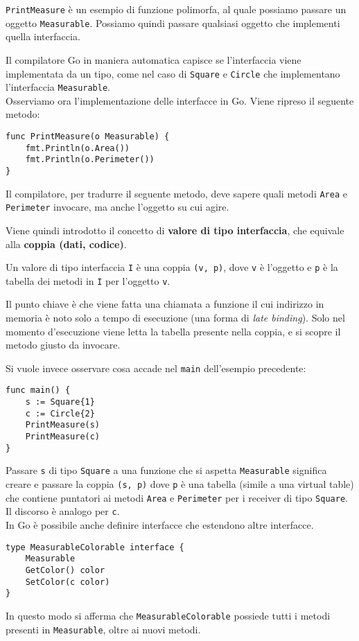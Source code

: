 \documentclass{article}
\begin{document}
\texttt{PrintMeasure} è un esempio di funzione polimorfa, al quale possiamo passare un oggetto \texttt{Measurable}. Possiamo quindi passare qualsiasi oggetto che implementi quella interfaccia.

Il compilatore Go in maniera automatica capisce se l'interfaccia viene implementata da un tipo, come nel caso di \texttt{Square} e \texttt{Circle} che implementano l'interfaccia \texttt{Measurable}.\vspace{14pt}\\
Osserviamo ora l'implementazione delle interfacce in Go. Viene ripreso il seguente metodo:
\begin{tcolorbox}
\begin{verbatim}
func PrintMeasure(o Measurable) {
    fmt.Println(o.Area())
    fmt.Println(o.Perimeter())
}
\end{verbatim}
\end{tcolorbox}
Il compilatore, per tradurre il seguente metodo, deve sapere quali metodi \texttt{Area} e \texttt{Perimeter} invocare, ma anche l'oggetto su cui agire.

Viene quindi introdotto il concetto di \textbf{valore di tipo interfaccia}, che equivale alla \textbf{coppia (dati, codice)}.

Un valore di tipo interfaccia \texttt{I} è una coppia \texttt{(v, p)}, dove \texttt{v} è l'oggetto e \texttt{p} è la tabella dei metodi in \texttt{I} per l'oggetto \texttt{v}.

Il punto chiave è che viene fatta una chiamata a funzione il cui indirizzo in memoria è noto solo a tempo di esecuzione (una forma di \textit{late binding}). Solo nel momento d'esecuzione viene letta la tabella presente nella coppia, e si scopre il metodo giusto da invocare.

\pagebreak

Si vuole invece osservare cosa accade nel \texttt{main} dell'esempio precedente:
\begin{tcolorbox}
\begin{verbatim}
func main() {
    s := Square{1}
    c := Circle{2}
    PrintMeasure(s)    
    PrintMeasure(c)    
}
\end{verbatim}
\end{tcolorbox}

Passare \texttt{s} di tipo \texttt{Square} a una funzione che si aspetta \texttt{Measurable} significa creare e passare la coppia \texttt{(s, p)} dove \texttt{p} è una tabella (simile a una virtual table) che contiene puntatori ai metodi \texttt{Area} e \texttt{Perimeter} per i receiver di tipo \texttt{Square}. Il discorso è analogo per \texttt{c}.\vspace{14pt}\\
In Go è possibile anche definire interfacce che estendono altre interfacce.
\begin{tcolorbox}
\begin{verbatim}
type MeasurableColorable interface {
    Measurable
    GetColor() color
    SetColor(c color)
}
\end{verbatim}
\end{tcolorbox}
In questo modo si afferma che \texttt{MeasurableColorable} possiede tutti i metodi presenti in \texttt{Measurable}, oltre ai nuovi metodi.
\end{document}
